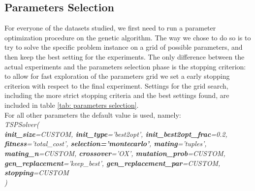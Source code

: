 \documentclass{article}
\begin{document}
\subsection{Parameters Selection}
For everyone of the datasets studied, we first need to run a parameter optimization procedure on the genetic algorithm. The way we chose to do so is to try to solve the specific problem instance on a grid of possible parameters, and then keep the best setting for the experiments. The only difference between the actual experiments and the parameters selection phase is the stopping criterion: to allow for fast exploration of the parameters grid we set a early stopping criterion with respect to the final experiment. Settings for the grid search, including the more strict stopping criteria and the best settings found, are included in table \ref{tab: parameters selection}. \\ \newpage
For all other parameters the default value is used, namely: \\
\newline
\textit{
TSPSolver( \\
\textbf{init\_size}=CUSTOM, \textbf{init\_type}='best2opt', \textbf{init\_best2opt\_frac}=0.2, \\
\textbf{fitness}='total\_cost', \textbf{selection='montecarlo'}, \textbf{mating}='tuples', \\
\textbf{mating\_n}=CUSTOM, \textbf{crossover}='OX', \textbf{mutation\_prob}=CUSTOM,\\
\textbf{gen\_replacement}='keep\_best', \textbf{gen\_replacement\_par}=CUSTOM, \\
\textbf{stopping}=CUSTOM \\
)
}
\newline
\end{document}
